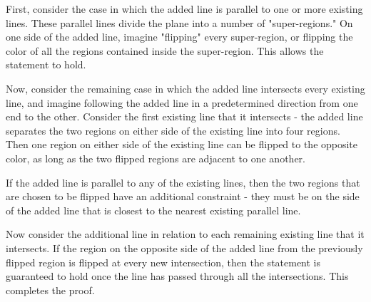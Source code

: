 First, consider the case in which the added line is parallel to one or more existing lines. These parallel lines divide the plane into a number of "super-regions." On one side of the added line, imagine "flipping" every super-region, or flipping the color of all the regions contained inside the super-region. This allows the statement to hold. \par
Now, consider the remaining case in which the added line intersects every existing line, and imagine following the added line in a predetermined direction from one end to the other. Consider the first existing line that it intersects - the added line separates the two regions on either side of the existing line into four regions. Then one region on either side of the existing line can be flipped to the opposite color, as long as the two flipped regions are adjacent to one another. \par
If the added line is parallel to any of the existing lines, then the two regions that are chosen to be flipped have an additional constraint - they must be on the side of the added line that is closest to the nearest existing parallel line. \par
Now consider the additional line in relation to each remaining existing line that it intersects. If the region on the opposite side of the added line from the previously flipped region is flipped at every new intersection, then the statement is guaranteed to hold once the line has passed through all the intersections. This completes the proof.